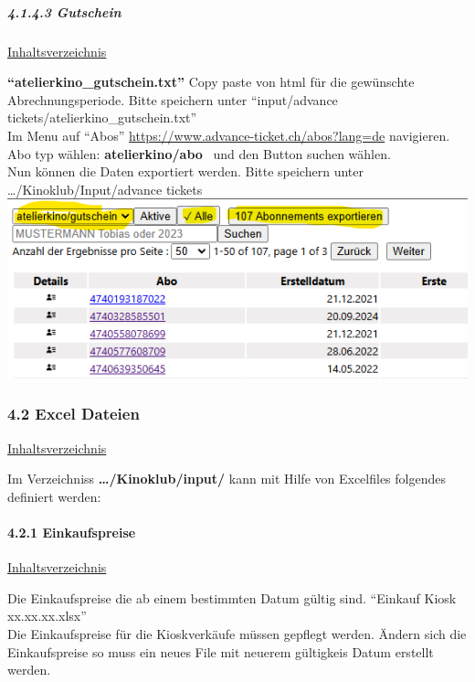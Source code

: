 \documentclass[
]{article}
\begin{document}
\subparagraph{4.1.4.3 Gutschein}\label{gutschein}

\hyperref[Inhaltsverzeichnis]{Inhaltsverzeichnis}

\textbf{``atelierkino\_gutschein.txt''} Copy paste von html für die
gewünschte Abrechnungsperiode. Bitte speichern unter ``input/advance
tickets/atelierkino\_gutschein.txt''\\
Im Menu auf ``Abos'' \url{https://www.advance-ticket.ch/abos?lang=de}
navigieren.\\
Abo typ wählen: \textbf{atelierkino/abo} ~und den Button suchen
wählen.\\
Nun können die Daten exportiert werden. Bitte speichern unter
\ldots/Kinoklub/Input/advance tickets\\
\includegraphics{doc/atelierkino_gutschein.png}

\subsubsection{4.2 Excel Dateien}\label{excel-dateien}

\hyperref[Inhaltsverzeichnis]{Inhaltsverzeichnis}

Im Verzeichniss \textbf{\ldots/Kinoklub/input/} kann mit Hilfe von
Excelfiles folgendes definiert werden:

\paragraph{4.2.1 Einkaufspreise}\label{einkaufspreise}

\hyperref[Inhaltsverzeichnis]{Inhaltsverzeichnis}

Die Einkaufspreise die ab einem bestimmten Datum gültig sind. ``Einkauf
Kiosk xx.xx.xx.xlsx''\\
Die Einkaufspreise für die Kioskverkäufe müssen gepflegt werden. Ändern
sich die Einkaufspreise so muss ein neues File mit neuerem gültigkeis
Datum erstellt werden.\\
\end{document}

